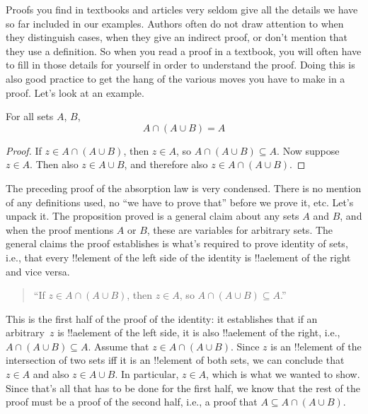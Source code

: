 \documentclass[../../../include/open-logic-section]{subfiles}
\begin{document}

Proofs you find in textbooks and articles very seldom give all the
details we have so far included in our examples. Authors often do not
draw attention to when they distinguish cases, when they give an
indirect proof, or don't mention that they use a definition.  So when
you read a proof in a textbook, you will often have to fill in those
details for yourself in order to understand the proof. Doing this is
also good practice to get the hang of the various moves you have to
make in a proof. Let's look at an example.

\begin{prop}[Absorption]
For all sets $A$, $B$,
\[
A \cap (A \cup B) = A
\]
\end{prop}

\begin{proof}
If $z \in A \cap (A \cup B)$, then $z \in A$, so $A \cap (A \cup B)
\subseteq A$. Now suppose $z \in A$. Then also $z \in A \cup B$, and
therefore also $z \in A \cap (A \cup B)$.
\end{proof}

The preceding proof of the absorption law is very condensed. There is
no mention of any definitions used, no ``we have to prove that''
before we prove it, etc. Let's unpack it.  The proposition proved is a
general claim about any sets $A$ and $B$, and when the proof mentions
$A$ or $B$, these are variables for arbitrary sets.  The general
claims the proof establishes is what's required to prove identity of
sets, i.e., that every !!{element} of the left side of the identity is
!!a{element} of the right and vice versa.  

\begin{quote}
``If $z \in A \cap (A \cup B)$, then $z \in A$, so $A \cap (A \cup B)
  \subseteq A$.''
\end{quote}

This is the first half of the proof of the identity: it establishes
that if an arbitrary~$z$ is !!a{element} of the left side, it is also
!!a{element} of the right, i.e., $A \cap (A \cup B) \subseteq A$.
Assume that $z \in A \cap (A \cup B)$. Since $z$ is an !!{element} of
the intersection of two sets iff it is an !!{element} of both sets, we
can conclude that $z \in A$ and also $z \in A \cup B$. In particular,
$z \in A$, which is what we wanted to show.  Since that's all that has
to be done for the first half, we know that the rest of the proof must
be a proof of the second half, i.e., a proof that $A \subseteq A \cap
(A \cup B)$.
\end{document}
